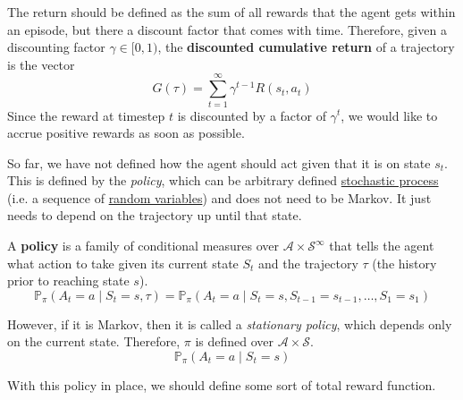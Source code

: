 \documentclass{article}
\begin{document}
  \begin{definition}[Return]
    \label{def:return}
    The return should be defined as the sum of all rewards that the agent gets within an episode, but there a discount factor that comes with time. Therefore, given a discounting factor $\gamma \in [0, 1)$, the \textbf{discounted cumulative return} of a trajectory is the vector 
    \begin{equation}
      G(\tau) = \sum_{t=1}^\infty \gamma^{t - 1} R(s_t, a_t)
    \end{equation}
    Since the reward at timestep $t$ is discounted by a factor of $\gamma^t$, we would like to accrue positive rewards as soon as possible.
  \end{definition}

  So far, we have not defined how the agent should act given that it is on state $s_t$. This is defined by the \textit{policy}, which can be arbitrary defined \hyperref[sp-def:stochastic-process]{stochastic process} (i.e. a sequence of \hyperref[prob-def:random-variable]{random variables}) and does not need to be Markov. It just needs to depend on the trajectory up until that state. 

  \begin{definition}[Policy]
    \label{def:policy}
    A \textbf{policy} is a family of conditional measures over $\mathcal{A} \times \mathcal{S}^\infty$ that tells the agent what action to take given its current state $S_t$ and the trajectory $\tau$ (the history prior to reaching state $s$).  
    \begin{equation}
      \mathbb{P}_\pi (A_t = a \mid S_t = s, \tau) = \mathbb{P}_{\pi} (A_t = a \mid S_t = s, S_{t-1} = s_{t-1}, \ldots, S_1 = s_1)
    \end{equation}
  \end{definition}

  \begin{definition}
    \label{def:stationary-policy}
    However, if it is Markov, then it is called a \textit{stationary policy}, which depends only on the current state. Therefore, $\pi$ is defined over $\mathcal{A} \times \mathcal{S}$. 
    \begin{equation}
      \mathbb{P}_\pi (A_t = a \mid S_t = s)
    \end{equation}
  \end{definition}

  With this policy in place, we should define some sort of total reward function. 
\end{document}
